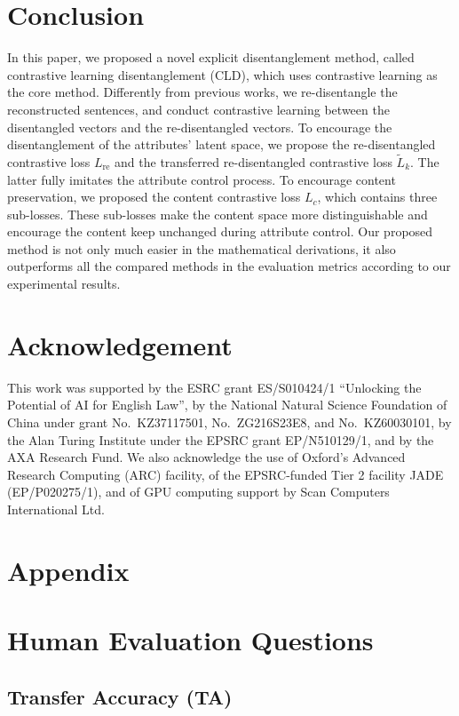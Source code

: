 \documentclass[11pt,a4paper]{article}
\newcommand{\Mname}{CLD}
\begin{document}
\section{Conclusion}
In this paper, we proposed a novel explicit disentanglement method, called 
contrastive learning disentanglement (\Mname), which uses contrastive learning as the core method. Differently from previous works, we re-disentangle the reconstructed sentences, and conduct contrastive learning between the disentangled vectors and the re-disentangled vectors. To encourage the disentanglement of the  attributes' latent space, we propose the re-disentangled contrastive loss $L_\text{re}$ and the transferred  re-disentangled contrastive loss $\tilde L_k$. The latter fully imitates the attribute control process. To encourage  content preservation, we proposed the content contrastive loss $L_c$, which contains three sub-losses. These sub-losses make the content space more distinguishable and encourage the content keep unchanged during attribute control. Our proposed method is not only much easier in the mathematical derivations, it also   outperforms all the compared methods in the evaluation metrics according to our experimental results.

\section*{Acknowledgement}
This work was supported by the ESRC grant ES/S010424/1 “Unlocking the Potential of AI for English Law”, by the National Natural Science Foundation of China under grant No.\ KZ37117501, No.\ ZG216S23E8, and  No.\ KZ60030101, by the Alan Turing Institute under the EPSRC grant EP/N510129/1, 
and by the AXA Research Fund. We also acknowledge the use of Oxford’s Advanced Research Computing
(ARC) facility, of the EPSRC-funded Tier 2 facility JADE (EP/P020275/1), and of GPU computing support by Scan Computers
International Ltd.



 

\onecolumn


\appendix
\section*{Appendix}
\section{Human Evaluation Questions}
\subsection{Transfer Accuracy (TA)}
  
\end{document}

